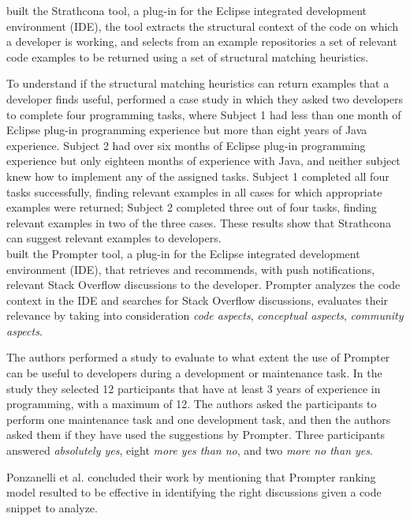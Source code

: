 \documentclass[12pt,mscthesis]{usiinfthesis}
\begin{document}
	\citet{Holmes:2005:USC:1062455.1062491}  built the Strathcona tool, a plug-in for the Eclipse integrated development environment (IDE), the tool extracts the structural context of the code on which a developer is working, and selects from an example repositories a set of relevant code examples to be returned using a set of structural matching heuristics.


	To understand if the structural matching heuristics can return examples that a developer finds useful, \citet{Holmes:2005:USC:1062455.1062491} performed a case study in which they asked two developers to complete four programming tasks, where Subject 1 had less than one month of Eclipse plug-in programming experience but more than eight years of Java experience. Subject 2 had over six months of Eclipse plug-in programming experience but only eighteen months of experience with Java, and neither subject knew how to implement any of the assigned tasks.
	Subject 1 completed all four tasks successfully, finding relevant examples in all cases for which appropriate examples were returned; Subject 2 completed three out of four tasks, finding relevant examples in two of the three cases. These results show that Strathcona can suggest relevant examples to developers.\\

	\citet{Ponz2014b} built the Prompter tool, a plug-in for the Eclipse integrated development environment (IDE), that retrieves and recommends, with push notifications, relevant Stack Overflow discussions to the developer. Prompter analyzes the code context in the IDE and searches for Stack Overflow discussions, evaluates their relevance by taking into consideration \emph{code aspects}, \emph{conceptual aspects}, \emph{community aspects}.


	The authors performed a study to evaluate to what extent the use of Prompter can be useful to developers during a development or maintenance task. In the study they selected 12 participants that have at least 3 years of experience in programming, with a maximum of 12. The authors asked the participants to perform one maintenance task and one development task, and then the authors asked them if they have used the suggestions by Prompter. Three participants answered \emph{absolutely yes}, eight \emph{more yes than no}, and two \emph{more no than yes}.


	Ponzanelli et al. concluded their work by mentioning that Prompter ranking model resulted to be effective in identifying the right discussions given a code snippet to analyze.\\
\end{document}
